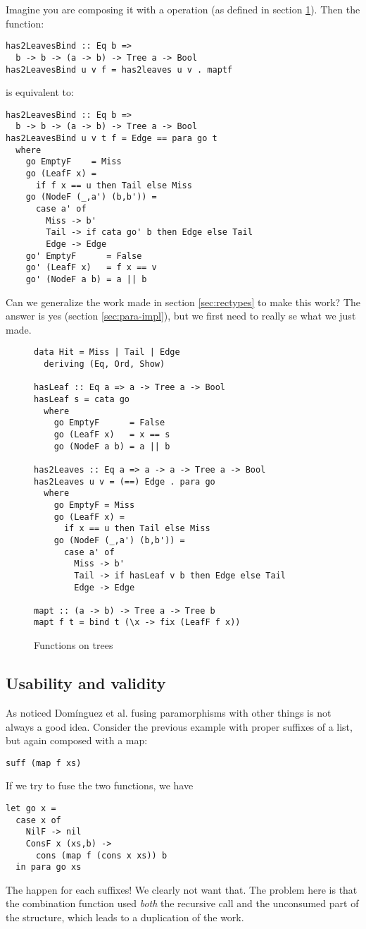 Imagine you are composing it with a  operation (as defined in section \ref{fig:has2Leaves}). Then
the function:
\begin{verbatim}
has2LeavesBind :: Eq b =>
  b -> b -> (a -> b) -> Tree a -> Bool
has2LeavesBind u v f = has2leaves u v . maptf
\end{verbatim}
\noindent is equivalent to:
\begin{verbatim}
has2LeavesBind :: Eq b =>
  b -> b -> (a -> b) -> Tree a -> Bool
has2LeavesBind u v t f = Edge == para go t
  where
    go EmptyF    = Miss
    go (LeafF x) =
      if f x == u then Tail else Miss
    go (NodeF (_,a') (b,b')) =
      case a' of
        Miss -> b'
        Tail -> if cata go' b then Edge else Tail
        Edge -> Edge
    go' EmptyF      = False
    go' (LeafF x)   = f x == v
    go' (NodeF a b) = a || b
\end{verbatim}

Can we generalize the work made in section \ref{sec:rectypes} to make this work? The answer is yes (section \ref{sec:para-impl}), but we first need to really se what we just made.

\begin{figure}
\begin{verbatim}
data Hit = Miss | Tail | Edge
  deriving (Eq, Ord, Show)

hasLeaf :: Eq a => a -> Tree a -> Bool
hasLeaf s = cata go
  where
    go EmptyF      = False
    go (LeafF x)   = x == s
    go (NodeF a b) = a || b

has2Leaves :: Eq a => a -> a -> Tree a -> Bool
has2Leaves u v = (==) Edge . para go
  where
    go EmptyF = Miss
    go (LeafF x) =
      if x == u then Tail else Miss
    go (NodeF (_,a') (b,b')) =
      case a' of
        Miss -> b'
        Tail -> if hasLeaf v b then Edge else Tail
        Edge -> Edge

mapt :: (a -> b) -> Tree a -> Tree b
mapt f t = bind t (\x -> fix (LeafF f x))
\end{verbatim}
\caption{Functions on trees}
\label{fig:has2Leaves}
\end{figure}

\subsection{Usability and validity}
As noticed Domínguez et al. \cite{paramorphismFusion} fusing paramorphisms with other things is not always a good idea. Consider the previous example with proper suffixes of a list, but again composed with a map:
\begin{verbatim}
suff (map f xs)
\end{verbatim}
\noindent If we try to fuse the two functions, we have
\begin{verbatim}
let go x =
  case x of
    NilF -> nil
    ConsF x (xs,b) -> 
      cons (map f (cons x xs)) b
  in para go xs
\end{verbatim}
\noindent The  happen for each suffixes! We clearly not want that.
The problem here is that the combination function used \emph{both} the recursive call and the unconsumed part of the structure, which leads to a duplication of the work.

